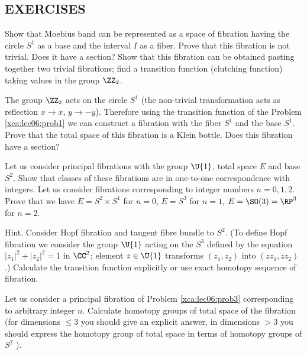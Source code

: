 \subsection*{EXERCISES}
\begin{xca}\label{xca:lec06:prob1}
Show that Moebius band can be represented as a space of fibration
having the circle $S^1$ as a base and the interval $I$ as a
fiber. Prove that this fibration is not trivial. Does it have a
section? Show that this fibration can be obtained pasting
together two trivial fibrations; find a transition function
(clutching function) taking values in the group $\ZZ_2$.
\end{xca}
\begin{xca}
The group $\ZZ_2$ acts on the circle $S^1$ (the non-trivial
transformation acts as reflection $x\to x$, $y\to-y$). Therefore
using the transition function of the
Problem \ref{xca:lec06:prob1} we can construct a fibration with
the fiber $S^1$ and the base $S^1$. Prove that the total space of
this fibration is a Klein bottle. Does this fibration have a
section?
\end{xca}
\begin{xca}\label{xca:lec06:prob3}
Let us consider principal fibrations with the group $\U{1}$,
total space $E$ and base $S^2$. Show that classes of these
fibrations are in one-to-one correspondence with integers. Let us
consider fibrations corresponding to integer numbers $n = 0, 1,
2$. Prove that we have $E = S^2\times S^1$ for $n = 0$, $E = S^3$
for $n = 1$, $E = \SO(3) = \RP^3$ for $n = 2$.

Hint. Consider Hopf fibration and tangent fibre bundle to
$S^2$. (To define Hopf fibration we consider the group $\U{1}$
acting on the $S^3$ defined by the equation $|z_{1}|^2 +
|z_{2}|^2 = 1$ in $\CC^2$; element $z\in\U{1}$ transforms $(z_1,
z_2)$ into $(zz_1, zz_2)$.) Calculate the transition function
explicitly or use exact homotopy sequence of fibration.
\end{xca}
\begin{xca}
Let us consider a principal fibration of Problem \ref{xca:lec06:prob3} corresponding to arbitrary integer
$n$. Calculate homotopy groups of total space of the fibration (for dimensions $\leq3$ you
should give an explicit answer, in dimensions $> 3$ you should express the homotopy group
of total space in terms of homotopy groups of $S^2$ ).
\end{xca}

